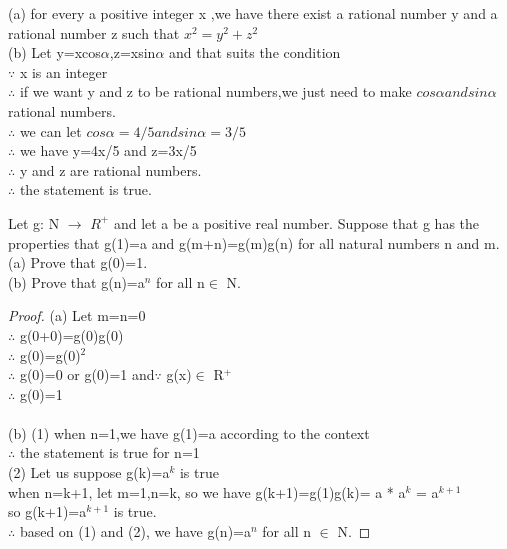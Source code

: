 \documentclass[11pt, a4paper, UTF8]{ctexart}
\begin{document}
\begin{solution}
  (a) for every a positive integer x ,we have there exist a rational number y and a rational number z such that $x^2=y^2 + z^2$\\
  (b) Let y=xcos$\alpha$,z=xsin$\alpha$ and that suits the condition\\
      $\because$ x is an integer\\
      $\therefore$ if we want y and z to be rational numbers,we just need to make $cos\alpha and sin\alpha$ rational numbers.\\
      $\therefore$ we can let $cos\alpha = 4/5  and  sin\alpha = 3/5$\\
      $\therefore$ we have y=4x/5 and z=3x/5\\
      $\therefore$ y and z are rational numbers.\\
      $\therefore$ the statement is true.

\end{solution}
\begin{problem}[UD: 17.11]
  Let g: N $\rightarrow$ $R^+$ and let a be a positive real number. Suppose that g has the properties that g(1)=a and g(m+n)=g(m)g(n) for all natural numbers n and m.\\
  (a) Prove that g(0)=1.\\
  (b) Prove that g(n)=a$^n$ for all n$\in$ N.
\end{problem}


\begin{proof}
  (a) Let m=n=0\\
  $\therefore$ g(0+0)=g(0)g(0)\\
  $\therefore$ g(0)=g(0)$^2$\\	
  $\therefore$ g(0)=0 or g(0)=1 
  and$\because$ g(x)$\in$ R$^+$\\
  $\therefore$ g(0)=1\\
  \\
  (b) (1) when n=1,we have g(1)=a according to the context \\
          $\therefore$ the statement is true for n=1\\
      (2) Let us suppose g(k)=a$^k$ is true\\
          when n=k+1, let m=1,n=k, so we have g(k+1)=g(1)g(k)= a * a$^k$ = a$^{k+1}$\\
          so g(k+1)=a$^{k+1}$ is true.\\
      $\therefore$ based on (1) and (2), we have g(n)=a$^n$ for all n $\in$ N.
\end{proof}
\end{document}
